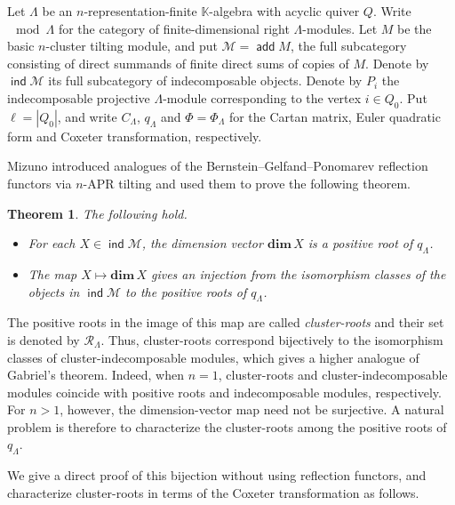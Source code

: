 \documentclass[11pt,a4paper]{amsart}
\newtheorem{theorem}{Theorem}[section]
\theoremstyle{definition}
\numberwithin{equation}{section}
\newcommand{\0}{\mathbf{0}}
\newcommand{\dimv}{\mathbf{dim}\,}
\DeclareMathOperator{\add}{\mathsf{add}}
\DeclareMathOperator{\ind}{\mathsf{ind}}
\begin{document}
	
	Let $\Lambda$ be an $n$-representation-finite $\mathbb K$-algebra
	with acyclic quiver $Q$.
	Write $\mod\Lambda$ for the category of finite-dimensional
	right $\Lambda$-modules.
	Let $M$ be the basic $n$-cluster tilting module, and put
	$\mathcal M=\add M$, the full subcategory consisting of
	direct summands of finite direct sums of copies of $M$. 
	Denote by $\ind\mathcal M$ its full subcategory of
	indecomposable objects. Denote by $P_i$
	the indecomposable projective
	$\Lambda$-module corresponding to the vertex $i \in Q_0$. 
	Put $\ell=|Q_0|$, and write $C_\Lambda$, $q_\Lambda$ and
	$\Phi=\Phi_\Lambda$ for the Cartan matrix, Euler quadratic
	form and Coxeter transformation, respectively.
	
	Mizuno introduced analogues of the
	Bernstein--Gelfand--Ponomarev reflection functors 
	via $n$-APR tilting and used them to prove the following theorem.  
	
	
	\begin{theorem} \cite[Theorem 1.2]{Miz}\label{Mizuno thm}  The following hold. 
		\begin{itemize}
			\item[(a)]
			For each $X\in \ind\mathcal M$,  
			the dimension vector ${\dimv} X$ is a positive root of $q_\Lambda$.
			\item[(b)]
			The map $X \mapsto {\dimv} X$ gives an injection from the isomorphism classes of the objects in $\ind\mathcal M$ to the positive roots of $q_\Lambda$.
		\end{itemize}
	\end{theorem}
	
		The positive roots in the image of this map are called \emph{cluster-roots} and their set is denoted by $\mathcal R_\Lambda$.  Thus,  cluster-roots correspond bijectively to the isomorphism classes of cluster-indecomposable modules,  which gives a higher analogue of Gabriel's theorem. Indeed, when $n=1$,  cluster-roots and cluster-indecomposable modules coincide with positive roots and indecomposable modules, respectively.
		 For $n>1$, however, the dimension-vector map need not be surjective. A natural problem is therefore to characterize the cluster-roots among the positive roots of $q_\Lambda$. 
		 
		 
		 We give a direct proof of this bijection without using reflection functors, and characterize cluster-roots in terms of the Coxeter transformation as follows.  	
			
	
	
\end{document}
